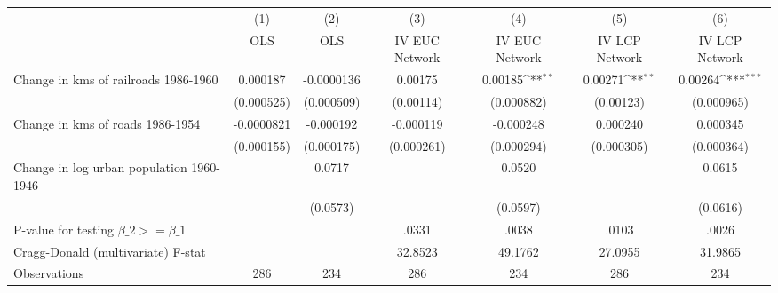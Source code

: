 {
\def\sym#1{\ifmmode^{#1}\else\(^{#1}\)\fi}
\begin{tabular}{l*{6}{c}}
\hline\hline
                &\multicolumn{1}{c}{(1)}&\multicolumn{1}{c}{(2)}&\multicolumn{1}{c}{(3)}&\multicolumn{1}{c}{(4)}&\multicolumn{1}{c}{(5)}&\multicolumn{1}{c}{(6)}\\
                &\multicolumn{1}{c}{OLS}&\multicolumn{1}{c}{OLS}&\multicolumn{1}{c}{IV EUC Network}&\multicolumn{1}{c}{IV EUC Network}&\multicolumn{1}{c}{IV LCP Network}&\multicolumn{1}{c}{IV LCP Network}\\
\hline
Change in kms of railroads 1986-1960& 0.000187         &-0.0000136         &  0.00175         &  0.00185\sym{**} &  0.00271\sym{**} &  0.00264\sym{***}\\
                &(0.000525)         &(0.000509)         &(0.00114)         &(0.000882)         &(0.00123)         &(0.000965)         \\
[1em]
Change in kms of roads 1986-1954&-0.0000821         &-0.000192         &-0.000119         &-0.000248         & 0.000240         & 0.000345         \\
                &(0.000155)         &(0.000175)         &(0.000261)         &(0.000294)         &(0.000305)         &(0.000364)         \\
[1em]
Change in log urban population 1960-1946&                  &   0.0717         &                  &   0.0520         &                  &   0.0615         \\
                &                  & (0.0573)         &                  & (0.0597)         &                  & (0.0616)         \\
\hline
P-value for testing $\beta\_{2} >= \beta\_{1}$&                  &                  &    .0331         &    .0038         &    .0103         &    .0026         \\
Cragg-Donald (multivariate) F-stat&                  &                  &  32.8523         &  49.1762         &  27.0955         &  31.9865         \\
Observations    &      286         &      234         &      286         &      234         &      286         &      234         \\
\hline\hline
\end{tabular}
}
